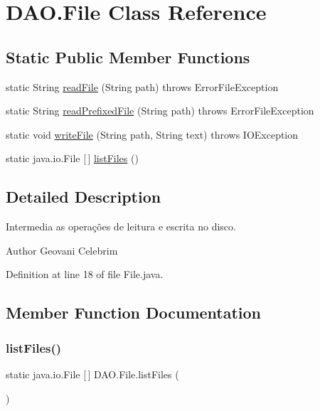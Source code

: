 \hypertarget{classDAO_1_1File}{}\section{D\+A\+O.\+File Class Reference}
\label{classDAO_1_1File}
\subsection*{Static Public Member Functions}
\begin{DoxyCompactItemize}
\item 
static String \hyperlink{classDAO_1_1File_a348c16a4685741546b894803f95fc8b7}{read\+File} (String path)  throws Error\+File\+Exception 
\item 
static String \hyperlink{classDAO_1_1File_ae6b4d0d0dc80f0e783e78bee62c3f7fe}{read\+Prefixed\+File} (String path)  throws Error\+File\+Exception 
\item 
static void \hyperlink{classDAO_1_1File_aff9e42d1f5bc8fbf1e70426585c09240}{write\+File} (String path, String text)  throws I\+O\+Exception 
\item 
static java.\+io.\+File \mbox{[}$\,$\mbox{]} \hyperlink{classDAO_1_1File_abd456e59e6420b8bd4b534c5ffa33158}{list\+Files} ()
\end{DoxyCompactItemize}


\subsection{Detailed Description}
Intermedia as operações de leitura e escrita no disco.

\begin{DoxyAuthor}{Author}
Geovani Celebrim 
\end{DoxyAuthor}


Definition at line 18 of file File.\+java.



\subsection{Member Function Documentation}
\hypertarget{classDAO_1_1File_abd456e59e6420b8bd4b534c5ffa33158}{}\label{classDAO_1_1File_abd456e59e6420b8bd4b534c5ffa33158} 
\subsubsection{\texorpdfstring{list\+Files()}{listFiles()}}
{\footnotesize\ttfamily static java.\+io.\+File \mbox{[}$\,$\mbox{]} D\+A\+O.\+File.\+list\+Files (\begin{DoxyParamCaption}{ }\end{DoxyParamCaption})\hspace{0.3cm}{\ttfamily [static]}}

